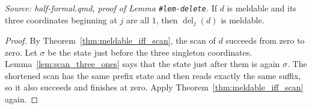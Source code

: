 \begin{lemma}
  \label{lem:delete_three_meldable}
  \textit{Source: half-formal.qmd, proof of Lemma
  \texttt{\#lem-delete}.}
  If \(d\) is meldable and its three coordinates beginning at \(j\) are
  all \(1\), then \(\operatorname{del}_j(d)\) is meldable.
\end{lemma}
\begin{proof}

\leanok
  By Theorem~\ref{thm:meldable_iff_scan}, the scan of \(d\) succeeds from
  zero to zero.  Let \(\sigma\) be the state just before the three
  singleton coordinates.  Lemma~\ref{lem:scan_three_ones} says that the
  state just after them is again \(\sigma\).  The shortened scan has the
  same prefix state and then reads exactly the same suffix, so it also
  succeeds and finishes at zero.  Apply
  Theorem~\ref{thm:meldable_iff_scan} again.
\end{proof}

